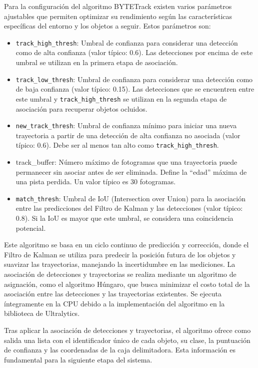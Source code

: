 \documentclass[11pt,spanish,listoffigures,listoftables]{tfgetsinf}
\begin{document}
Para la configuración del algoritmo BYTETrack existen varios parámetros ajustables que permiten optimizar su rendimiento según las características específicas del entorno y los objetos a seguir. Estos parámetros son:
\begin{itemize}
   \item \texttt{track\_high\_thresh}: Umbral de confianza para considerar una detección como de alta confianza (valor típico: 0.6). Las detecciones por encima de este umbral se utilizan en la primera etapa de asociación.
   \item \texttt{track\_low\_thresh}: Umbral de confianza para considerar una detección como de baja confianza (valor típico: 0.15). Las detecciones que se encuentren entre este umbral y \texttt{track\_high\_thresh} se utilizan en la segunda etapa de asociación para recuperar objetos ocluidos.
   \item \texttt{new\_track\_thresh}: Umbral de confianza mínimo para iniciar una nueva trayectoria a partir de una detección de alta confianza no asociada (valor típico: 0.6). Debe ser al menos tan alto como \texttt{track\_high\_thresh}.
   \item track\_buffer: Número máximo de fotogramas que una trayectoria puede permanecer sin asociar antes de ser eliminada. Define la ``edad'' máxima de una pista perdida. Un valor típico es 30 fotogramas.
   \item \texttt{match\_thresh}: Umbral de IoU (Intersection over Union) para la asociación entre las predicciones del Filtro de Kalman y las detecciones (valor típico: 0.8). Si la IoU es mayor que este umbral, se considera una coincidencia potencial.
\end{itemize}

Este algoritmo se basa en un ciclo continuo de predicción y corrección, donde el Filtro de Kalman se utiliza para predecir la posición futura de los objetos y suavizar las trayectorias, manejando la incertidumbre en las mediciones. La asociación de detecciones y trayectorias se realiza mediante un algoritmo de asignación, como el algoritmo Húngaro, que busca minimizar el costo total de la asociación entre las detecciones y las trayectorias existentes. Se ejecuta íntegramente en la CPU debido a la implementación del algoritmo en la biblioteca de Ultralytics.

Tras aplicar la asociación de detecciones y trayectorias, el algoritmo ofrece como salida una lista con el identificador único de cada objeto, su clase, la puntuación de confianza y las coordenadas de la caja delimitadora. Esta información es fundamental para la siguiente etapa del sistema.
\end{document}
